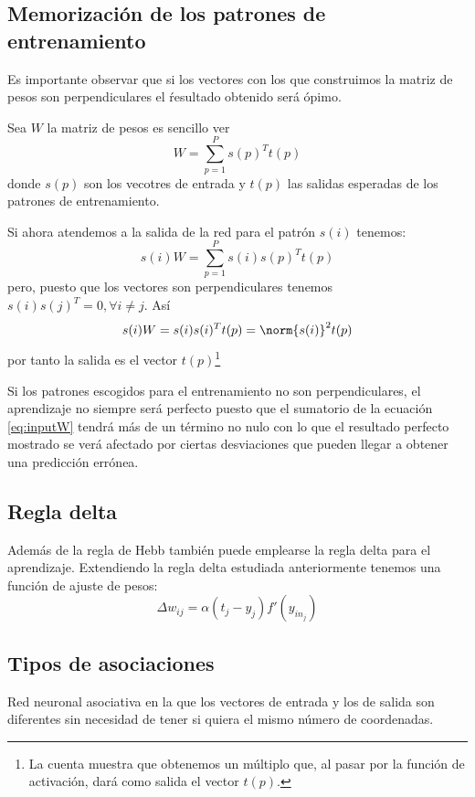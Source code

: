 \subsection{Memorización de los patrones de entrenamiento}

Es importante observar que si los vectores con los que construimos la matriz de pesos son perpendiculares el ŕesultado obtenido será ópimo.

Sea $W$ la matriz de pesos es sencillo ver
\[W = \sum_{p=1}^Ps(p)^Tt(p)\]
donde $s(p)$ son los vecotres de entrada y $t(p)$ las salidas esperadas de los patrones de entrenamiento.

Si ahora atendemos a la salida de la red para el patrón $s(i)$ tenemos:
\begin{equation}\label{eq:inputW}
s(i)W = \sum_{p=1}^Ps(i)s(p)^Tt(p)
\end{equation}
pero, puesto que los vectores son perpendiculares tenemos $s(i)s(j)^T=0, \forall i\neq j$. Así
\[s(i)W = s(i)s(i)^Tt(p) = \norm{s(i)}^2t(p)\]
por tanto la salida es el vector $t(p)$\footnote{La cuenta muestra que obtenemos un múltiplo que, al pasar por la función de activación, dará como salida el vector $t(p)$.}

\obs Si los patrones escogidos para el entrenamiento no son perpendiculares, el aprendizaje no siempre será perfecto puesto que el sumatorio de la ecuación \ref{eq:inputW} tendrá más de un término no nulo con lo que el resultado perfecto mostrado se verá afectado por ciertas desviaciones que pueden llegar a obtener una predicción errónea.


\subsection{Regla delta}
Además de la regla de Hebb también puede emplearse la regla delta para el aprendizaje. Extendiendo la regla delta estudiada anteriormente tenemos una función de ajuste de pesos:
\[Δw_{ij} = α(t_j-y_j)f'(y_{in_j})\]

\subsection{Tipos de asociaciones}
\begin{defn}
Red neuronal asociativa en la que los vectores de entrada y los de salida son diferentes sin necesidad de tener si quiera el mismo número de coordenadas.\\
\end{defn}

